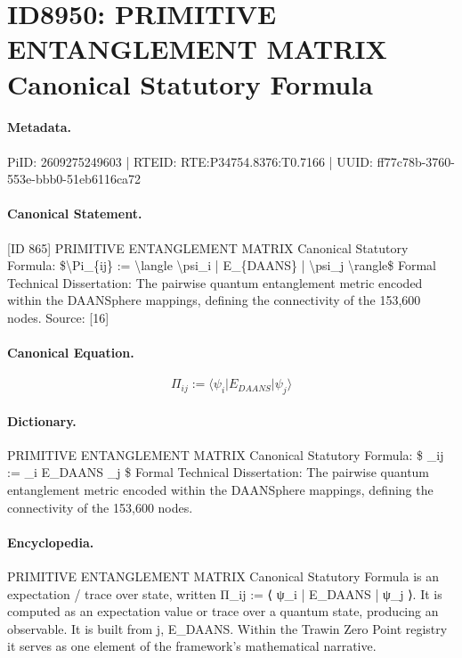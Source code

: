 \section*{ID8950: PRIMITIVE ENTANGLEMENT MATRIX Canonical Statutory Formula}
\paragraph{Metadata.}
PiID: 2609275249603 | RTEID: RTE:P34754.8376:T0.7166 | UUID: ff77c78b-3760-553e-bbb0-51eb6116ca72

\paragraph{Canonical Statement.}
[ID 865] PRIMITIVE ENTANGLEMENT MATRIX Canonical Statutory Formula: \$\textbackslash{}Pi\_\{ij\} := \textbackslash{}langle \textbackslash{}psi\_i | E\_\{DAANS\} | \textbackslash{}psi\_j \textbackslash{}rangle\$ Formal Technical Dissertation: The pairwise quantum entanglement metric encoded within the DAANSphere mappings, defining the connectivity of the 153,600 nodes. Source: [16]

\paragraph{Canonical Equation.}
\[
\Pi_{ij} := \langle \psi_i | E_{DAANS} | \psi_j \rangle
\]

\paragraph{Dictionary.}
PRIMITIVE ENTANGLEMENT MATRIX Canonical Statutory Formula: \$ \_ij := \_i E\_DAANS \_j \$ Formal Technical Dissertation: The pairwise quantum entanglement metric encoded within the DAANSphere mappings, defining the connectivity of the 153,600 nodes.

\paragraph{Encyclopedia.}
PRIMITIVE ENTANGLEMENT MATRIX Canonical Statutory Formula is an expectation / trace over state, written Π\_ij := ⟨ ψ\_i | E\_DAANS | ψ\_j ⟩. It is computed as an expectation value or trace over a quantum state, producing an observable. It is built from j, E\_DAANS. Within the Trawin Zero Point registry it serves as one element of the framework's mathematical narrative.
